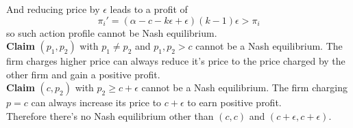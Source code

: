 \documentclass[11pt]{article}
\begin{document}
\begin{example}
\begin{equation}
		\end{equation}
		And reducing price by $\epsilon$ leads to a profit of
		\begin{equation}
			\pi_i ' = (\alpha - c - k \epsilon + \epsilon) (k-1)\epsilon > \pi_i
		\end{equation}
		so such action profile cannot be Nash equilibrium. \\
		\textbf{Claim} $(p_1, p_2)$ with $p_1 \neq p_2$ and $p_1, p_2 > c$ cannot be a Nash equilibrium. The firm charges higher price can always reduce it's price to the price charged by the other firm and gain a positive profit. \\
		\textbf{Claim} $(c, p_2)$ with $p_2 \geq c + \epsilon$ cannot be a Nash equilibrium. The firm charging $p = c $ can always increase its price to $c + \epsilon$ to earn positive profit. \\
		Therefore there's no Nash equilibrium other than $(c,c)$ and $(c+\epsilon, c+\epsilon)$.
	\end{example}
	
\end{document}
